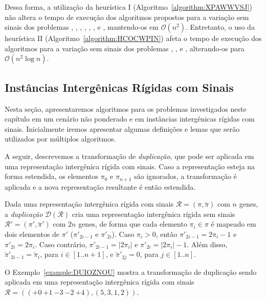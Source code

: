 Dessa forma, a utilização da heurística I (Algoritmo~\ref{algorithm:XPAWWVSJ}) não altera o tempo de execução dos algoritmos propostos para a variação sem sinais dos problemas \SbIR{}, \SbIRI{}, \SbIRM{}, \SbIRMI{}, \SbIRT{}, \SbIRTI{}, \SbIRTM{} e \SbIRTMI{}, mantendo-os em $\mathcal{O}(n^2)$. Entretanto, o uso da heurística II (Algoritmo~\ref{algorithm:HCOCWPIN}) afeta o tempo de execução dos algoritmos para a variação sem sinais dos problemas \SbIRM{}, \SbIRMI{}, \SbIRTM{} e \SbIRTMI{}, alterando-os para $\mathcal{O}(n^2 \log n)$.


\subsection{Instâncias Intergênicas Rígidas com Sinais}

Nesta seção, apresentaremos algoritmos para os problemas investigados neste capítulo em um cenário não ponderado e em instâncias intergênicas rígidas com sinais. Inicialmente iremos apresentar algumas definições e lemas que serão utilizados por múltiplos algoritmos.

A seguir, descrevemos a transformação de \emph{duplicação}, que pode ser aplicada em uma representação intergênica rígida com sinais. Caso a representação esteja na forma estendida, os elementos $\pi_0$ e $\pi_{n+1}$ são ignorados, a transformação é aplicada e a nova representação resultante é então estendida.

\begin{definition}
Dada uma representação intergênica rígida com sinais $\mathcal{R}=(\pi,\breve\pi)$ com $n$ genes, a \emph{duplicação} $\mathcal{D}(\mathcal{R})$ cria uma representação intergênica rígida sem sinais $\mathcal{R'}=(\pi',\breve\pi')$ com $2n$ genes, de forma que cada elemento $\pi_i \in \pi$ é mapeado em dois elementos de $\pi'$ ($\pi'_{2i-1}$ e $\pi'_{2i}$). Caso $\pi_i > 0$, então $\pi'_{2i-1} = 2\pi_i-1$ e $\pi'_{2i} = 2\pi_i$. Caso contrário, $\pi'_{2i-1} = |2\pi_i|$ e $\pi'_{2i} = |2\pi_i|-1$. Além disso, $\breve\pi'_{2i-1} = \breve\pi_i$, para $i\in[1..{n+1}]$, e $\breve\pi'_{2j} = 0$, para $j\in[1..n]$.
\end{definition}

O Exemplo~\ref{example:DUIOZNOU} mostra a transformação de duplicação sendo aplicada em uma representação intergênica rígida com sinais $\mathcal{R}=(({+0}~{+1}~{-3}~{-2}~{+4}),(5,3,1,2))$.

